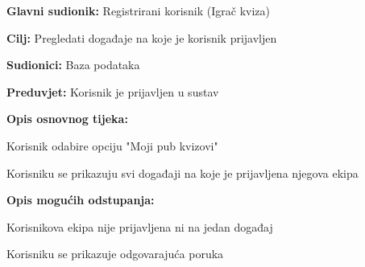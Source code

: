 				
				\noindent {}
				\begin{packed_item}
					
					\item \textbf{Glavni sudionik:} Registrirani korisnik (Igrač kviza)
					\item  \textbf{Cilj:} Pregledati događaje na koje je korisnik prijavljen
					\item  \textbf{Sudionici:} Baza podataka
					\item  \textbf{Preduvjet:} Korisnik je prijavljen u sustav
					\item  \textbf{Opis osnovnog tijeka:}
					
					\item[] \begin{packed_enum}
						
						\item Korisnik odabire opciju "Moji pub kvizovi"
						\item Korisniku se prikazuju svi događaji na koje je prijavljena njegova ekipa
						
					\end{packed_enum}
					
					\item  \textbf{Opis mogućih odstupanja:}
					
					\item[] \begin{packed_item}
						
						\item[2.a] Korisnikova ekipa nije prijavljena ni na jedan događaj
						\item[] \begin{packed_enum}
							
							\item Korisniku se prikazuje odgovarajuća poruka
							
						\end{packed_enum}
						
					\end{packed_item}
				\end{packed_item}
				
